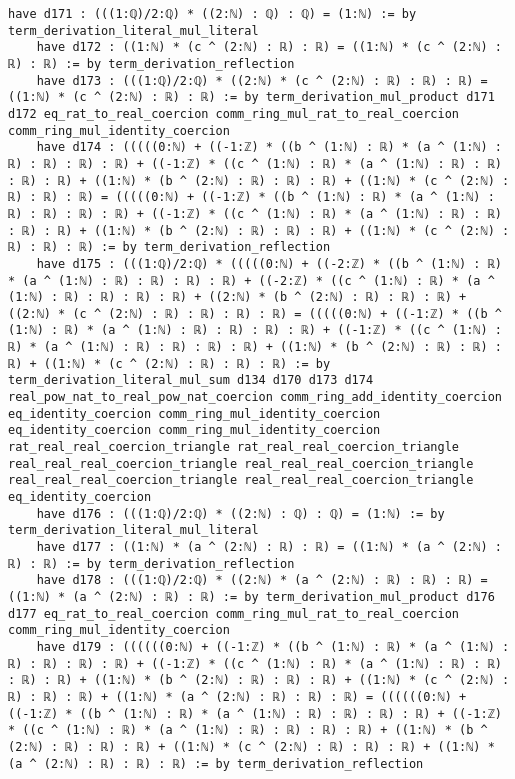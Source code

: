 \documentclass{article}
\begin{document}
\begin{tcolorbox}[colback=white!10, width=\linewidth]
\begin{lstlisting}[language=Lean4]
    have d171 : (((1:ℚ)/2:ℚ) * ((2:ℕ) : ℚ) : ℚ) = (1:ℕ) := by term_derivation_literal_mul_literal
    have d172 : ((1:ℕ) * (c ^ (2:ℕ) : ℝ) : ℝ) = ((1:ℕ) * (c ^ (2:ℕ) : ℝ) : ℝ) := by term_derivation_reflection
    have d173 : (((1:ℚ)/2:ℚ) * ((2:ℕ) * (c ^ (2:ℕ) : ℝ) : ℝ) : ℝ) = ((1:ℕ) * (c ^ (2:ℕ) : ℝ) : ℝ) := by term_derivation_mul_product d171 d172 eq_rat_to_real_coercion comm_ring_mul_rat_to_real_coercion comm_ring_mul_identity_coercion
    have d174 : (((((0:ℕ) + ((-1:ℤ) * ((b ^ (1:ℕ) : ℝ) * (a ^ (1:ℕ) : ℝ) : ℝ) : ℝ) : ℝ) + ((-1:ℤ) * ((c ^ (1:ℕ) : ℝ) * (a ^ (1:ℕ) : ℝ) : ℝ) : ℝ) : ℝ) + ((1:ℕ) * (b ^ (2:ℕ) : ℝ) : ℝ) : ℝ) + ((1:ℕ) * (c ^ (2:ℕ) : ℝ) : ℝ) : ℝ) = (((((0:ℕ) + ((-1:ℤ) * ((b ^ (1:ℕ) : ℝ) * (a ^ (1:ℕ) : ℝ) : ℝ) : ℝ) : ℝ) + ((-1:ℤ) * ((c ^ (1:ℕ) : ℝ) * (a ^ (1:ℕ) : ℝ) : ℝ) : ℝ) : ℝ) + ((1:ℕ) * (b ^ (2:ℕ) : ℝ) : ℝ) : ℝ) + ((1:ℕ) * (c ^ (2:ℕ) : ℝ) : ℝ) : ℝ) := by term_derivation_reflection
    have d175 : (((1:ℚ)/2:ℚ) * (((((0:ℕ) + ((-2:ℤ) * ((b ^ (1:ℕ) : ℝ) * (a ^ (1:ℕ) : ℝ) : ℝ) : ℝ) : ℝ) + ((-2:ℤ) * ((c ^ (1:ℕ) : ℝ) * (a ^ (1:ℕ) : ℝ) : ℝ) : ℝ) : ℝ) + ((2:ℕ) * (b ^ (2:ℕ) : ℝ) : ℝ) : ℝ) + ((2:ℕ) * (c ^ (2:ℕ) : ℝ) : ℝ) : ℝ) : ℝ) = (((((0:ℕ) + ((-1:ℤ) * ((b ^ (1:ℕ) : ℝ) * (a ^ (1:ℕ) : ℝ) : ℝ) : ℝ) : ℝ) + ((-1:ℤ) * ((c ^ (1:ℕ) : ℝ) * (a ^ (1:ℕ) : ℝ) : ℝ) : ℝ) : ℝ) + ((1:ℕ) * (b ^ (2:ℕ) : ℝ) : ℝ) : ℝ) + ((1:ℕ) * (c ^ (2:ℕ) : ℝ) : ℝ) : ℝ) := by term_derivation_literal_mul_sum d134 d170 d173 d174 real_pow_nat_to_real_pow_nat_coercion comm_ring_add_identity_coercion eq_identity_coercion comm_ring_mul_identity_coercion eq_identity_coercion comm_ring_mul_identity_coercion rat_real_real_coercion_triangle rat_real_real_coercion_triangle real_real_real_coercion_triangle real_real_real_coercion_triangle real_real_real_coercion_triangle real_real_real_coercion_triangle eq_identity_coercion
    have d176 : (((1:ℚ)/2:ℚ) * ((2:ℕ) : ℚ) : ℚ) = (1:ℕ) := by term_derivation_literal_mul_literal
    have d177 : ((1:ℕ) * (a ^ (2:ℕ) : ℝ) : ℝ) = ((1:ℕ) * (a ^ (2:ℕ) : ℝ) : ℝ) := by term_derivation_reflection
    have d178 : (((1:ℚ)/2:ℚ) * ((2:ℕ) * (a ^ (2:ℕ) : ℝ) : ℝ) : ℝ) = ((1:ℕ) * (a ^ (2:ℕ) : ℝ) : ℝ) := by term_derivation_mul_product d176 d177 eq_rat_to_real_coercion comm_ring_mul_rat_to_real_coercion comm_ring_mul_identity_coercion
    have d179 : ((((((0:ℕ) + ((-1:ℤ) * ((b ^ (1:ℕ) : ℝ) * (a ^ (1:ℕ) : ℝ) : ℝ) : ℝ) : ℝ) + ((-1:ℤ) * ((c ^ (1:ℕ) : ℝ) * (a ^ (1:ℕ) : ℝ) : ℝ) : ℝ) : ℝ) + ((1:ℕ) * (b ^ (2:ℕ) : ℝ) : ℝ) : ℝ) + ((1:ℕ) * (c ^ (2:ℕ) : ℝ) : ℝ) : ℝ) + ((1:ℕ) * (a ^ (2:ℕ) : ℝ) : ℝ) : ℝ) = ((((((0:ℕ) + ((-1:ℤ) * ((b ^ (1:ℕ) : ℝ) * (a ^ (1:ℕ) : ℝ) : ℝ) : ℝ) : ℝ) + ((-1:ℤ) * ((c ^ (1:ℕ) : ℝ) * (a ^ (1:ℕ) : ℝ) : ℝ) : ℝ) : ℝ) + ((1:ℕ) * (b ^ (2:ℕ) : ℝ) : ℝ) : ℝ) + ((1:ℕ) * (c ^ (2:ℕ) : ℝ) : ℝ) : ℝ) + ((1:ℕ) * (a ^ (2:ℕ) : ℝ) : ℝ) : ℝ) := by term_derivation_reflection

\end{lstlisting}
\end{tcolorbox}
\end{document}
